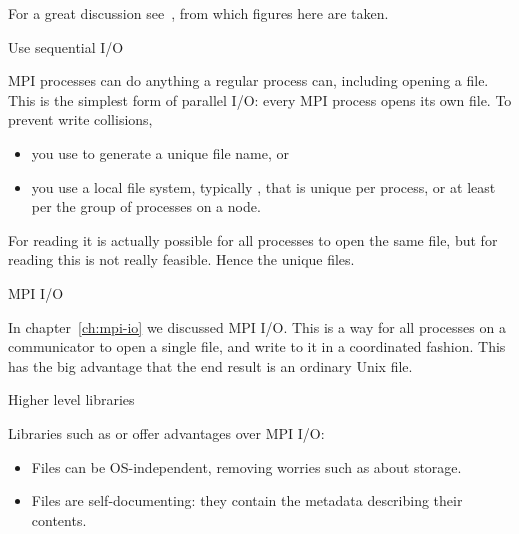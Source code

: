 
For a great discussion see~\cite{Mendez:ParallelIOpage},
from which figures here are taken.

 {Use sequential I/O}

MPI processes can do anything a regular process can,
including opening a file.
This is the simplest form of parallel I/O:
every MPI process opens its own file.
To prevent write collisions,
\begin{itemize}
\item you use  to generate a unique file name, or
\item you use a local file system, typically , that is unique
  per process, or at least per the group of processes on a node.
\end{itemize}

For reading it is actually possible for all processes to open the same file,
but for reading this is not really feasible. Hence the unique files.

 {MPI I/O}

In chapter~\ref{ch:mpi-io} we discussed MPI I/O.
This is a way for all processes on a communicator to open a single file,
and write to it in a coordinated fashion.
This has the big advantage that the end result is an ordinary Unix file.

 {Higher level libraries}

Libraries such as  or 
offer advantages over MPI I/O:
\begin{itemize}
\item Files can be OS-independent, removing worries such
  as about  storage.
\item Files are self-documenting: they contain the metadata describing their contents.
\end{itemize}


